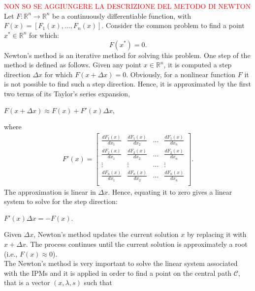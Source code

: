\documentclass[a4paper,10 pt,titlepage,twoside]{book}
\theoremstyle{plain}
\theoremstyle{definition}
\theoremstyle{remark}
\begin{document}
{{	\section{}
	\textcolor{red}{NON SO SE AGGIUNGERE LA DESCRIZIONE DEL METODO DI NEWTON}\\
	Let $F \colon \mathbb{R}^{n} \to \mathbb{R}^{n}$ be a continuously differentiable function, with $F(x) = [F_{1}(x),\dots,F_{n}(x)] $. Consider the common problem to find a point $x^{*}\in\mathbb{R}^{n}$ for which:
\begin{equation*}
F(x^{*})=0.
\end{equation*}
Newton's method is an iterative method for solving this problem. One step of the method is defined as follows. Given any point $x\in\mathbb{R}^{n}$, it is computed a step direction $\Delta x$ for which $F(x + \Delta x)=0$. Obviously, for a nonlinear function $F$ it is not possible to find such a step direction. Hence, it is approximated by the first two terms of its Taylor's series expansion,
\begin{center}
	$F(x+\Delta x)\approx F(x) + F'(x)\Delta x$,
\end{center}
where
\begin{align*}
F'(x)= \begin{bmatrix}\frac{dF_{1}(x)}{dx_{1}}&\frac{dF_{1}(x)}{dx_{2}}&\dots&\frac{dF_{1}(x)}{dx_{n}}\\
\frac{dF_{2}(x)}{dx_{1}}&\frac{dF_{2}(x)}{dx_{2}}&\dots&\frac{dF_{2}(x)}{dx_{n}}\\
\vdots&\vdots&\dots&\vdots\\
\frac{dF_{n}(x)}{dx_{1}}&\frac{dF_{n}(x)}{dx_{2}}&\dots&\frac{dF_{n}(x)}{dx_{n}}\\
\end{bmatrix}.
\end{align*}
The approximation is linear in $\Delta x$. Hence, equating it to zero gives a linear system to solve for the step direction:
\begin{center}
	$F'(x)\Delta x = -F(x)$.
\end{center}
Given $\Delta x$, Newton's method updates the current solution $x$ by replacing it with $x+\Delta x$. The process continues until the current solution is approximately a root (i.e., $F(x)\approx0$). \\
The Newton’s method is very important to solve the linear system associated with the IPMs and it is applied in order to find a point on the central path $\mathcal{C}$, that is a vector $(x,\lambda, s)$ such that
 \begin{center}

\end{center}}}
\end{document}
